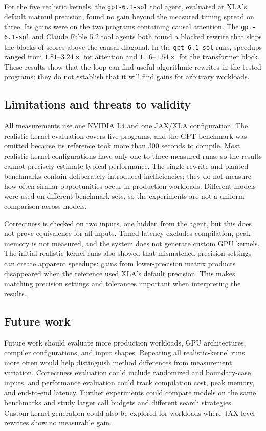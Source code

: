 \documentclass[conference]{IEEEtran}
\begin{document}
For the five realistic kernels, the \texttt{gpt-6.1-sol} tool agent, evaluated
at XLA's default matmul precision, found no gain beyond the measured timing
spread on three. Its gains were on the two programs containing causal
attention. The \texttt{gpt-6.1-sol} and Claude Fable 5.2 tool agents both found
a blocked rewrite that skips the blocks of scores above the causal diagonal. In the
\texttt{gpt-6.1-sol} runs, speedups ranged from $1.81$--$3.24\times$ for
attention and $1.16$--$1.54\times$ for the transformer block. These results
show that the loop can find useful algorithmic rewrites in the tested
programs; they do not establish that it will find gains for arbitrary
workloads.

\subsection{Limitations and threats to validity}
All measurements use one NVIDIA L4 and one JAX/XLA configuration. The
realistic-kernel evaluation covers five programs, and the GPT benchmark was
omitted because its reference took more than 300 seconds to compile. Most
realistic-kernel configurations have only one to three measured runs, so the
results cannot precisely estimate typical performance. The single-rewrite
and planted benchmarks contain deliberately introduced inefficiencies; they
do not measure how often similar opportunities occur in production workloads.
Different models were used on different benchmark sets, so the experiments
are not a uniform comparison across models.

Correctness is checked on two inputs, one hidden from the agent, but this
does not prove equivalence for all inputs. Timed latency excludes compilation,
peak memory is not measured, and the system does not generate custom GPU
kernels. The initial realistic-kernel runs also showed that mismatched
precision settings can create apparent speedups: gains from lower-precision
matrix products disappeared when the reference used XLA's default precision.
This makes matching precision settings and tolerances important when
interpreting the results.

\subsection{Future work}
Future work should evaluate more production workloads, GPU architectures,
compiler configurations, and input shapes. Repeating all realistic-kernel
runs more often would help distinguish method differences from measurement
variation. Correctness evaluation could include randomized and boundary-case
inputs, and performance evaluation could track compilation cost, peak memory,
and end-to-end latency. Further experiments could compare models on the same
benchmarks and study larger call budgets and different search strategies.
Custom-kernel generation could also be explored for workloads where JAX-level
rewrites show no measurable gain.
\end{document}
